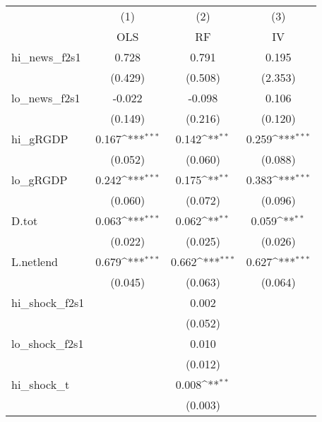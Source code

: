 {
\def\sym#1{\ifmmode^{#1}\else\(^{#1}\)\fi}
\begin{tabular}{l*{3}{c}}
\toprule
            &\multicolumn{1}{c}{(1)}&\multicolumn{1}{c}{(2)}&\multicolumn{1}{c}{(3)}\\
            &\multicolumn{1}{c}{OLS}&\multicolumn{1}{c}{RF}&\multicolumn{1}{c}{IV}\\
\midrule
hi\_news\_f2s1&       0.728         &       0.791         &       0.195         \\
            &     (0.429)         &     (0.508)         &     (2.353)         \\
\addlinespace
lo\_news\_f2s1&      -0.022         &      -0.098         &       0.106         \\
            &     (0.149)         &     (0.216)         &     (0.120)         \\
\addlinespace
hi\_gRGDP    &       0.167\sym{***}&       0.142\sym{**} &       0.259\sym{***}\\
            &     (0.052)         &     (0.060)         &     (0.088)         \\
\addlinespace
lo\_gRGDP    &       0.242\sym{***}&       0.175\sym{**} &       0.383\sym{***}\\
            &     (0.060)         &     (0.072)         &     (0.096)         \\
\addlinespace
D.tot       &       0.063\sym{***}&       0.062\sym{**} &       0.059\sym{**} \\
            &     (0.022)         &     (0.025)         &     (0.026)         \\
\addlinespace
L.netlend   &       0.679\sym{***}&       0.662\sym{***}&       0.627\sym{***}\\
            &     (0.045)         &     (0.063)         &     (0.064)         \\
\addlinespace
hi\_shock\_f2s1&                     &       0.002         &                     \\
            &                     &     (0.052)         &                     \\
\addlinespace
lo\_shock\_f2s1&                     &       0.010         &                     \\
            &                     &     (0.012)         &                     \\
\addlinespace
hi\_shock\_t  &                     &       0.008\sym{**} &                     \\
            &                     &     (0.003)         &                     \\

\end{tabular}}
